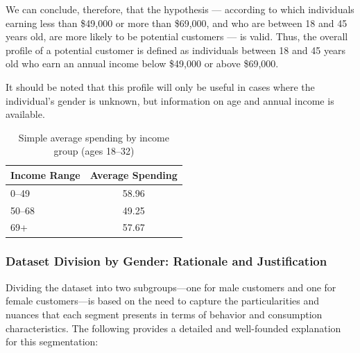 \documentclass[10pt]{article}
\begin{document}
We can conclude, therefore, that the hypothesis — according to which individuals earning less than \$49,000 or more than \$69,000, and who are between 18 and 45 years old, are more likely to be potential customers — is valid. Thus, the overall profile of a potential customer is defined as individuals between 18 and 45 years old who earn an annual income below \$49,000 or above \$69,000.

It should be noted that this profile will only be useful in cases where the individual's gender is unknown, but information on age and annual income is available.

\begin{table}[h]
    \centering
    \begin{tabular}{lc}
        \toprule
        \textbf{Income Range} & \textbf{Average Spending} \\
        \midrule
        0--49 & 58.96 \\
        50--68 & 49.25 \\
        69+   & 57.67 \\
        \bottomrule
    \end{tabular}
    \caption{Simple average spending by income group (ages 18--32)}
    \label{tab:spending_income}
\end{table}

\subsubsection{Dataset Division by Gender: Rationale and Justification}

Dividing the dataset into two subgroups—one for male customers and one for female customers—is based on the need to capture the particularities and nuances that each segment presents in terms of behavior and consumption characteristics. The following provides a detailed and well-founded explanation for this segmentation:
\end{document}
